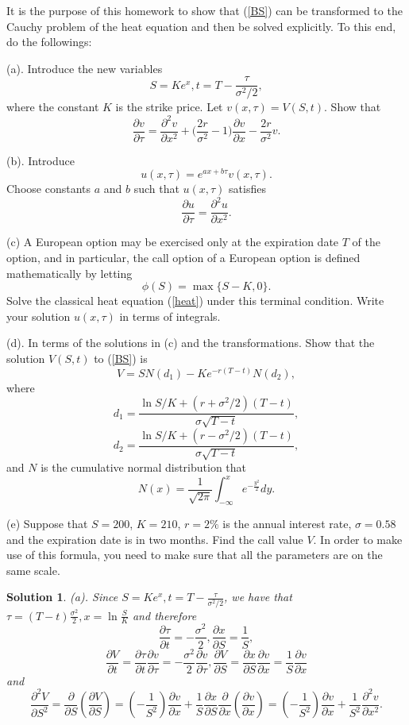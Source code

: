 \documentclass[6pt]{article}
\newtheorem{solution}{Solution}
\numberwithin{equation}{section}
\begin{document}
\begin{enumerate}
It is the purpose of this homework to show that (\ref{BS}) can be transformed to the Cauchy problem of the heat equation and then be solved explicitly.  To this end, do the followings:

(a).  Introduce the new variables
\[S=Ke^x, t=T-\frac{\tau}{\sigma^2/2},\]
where the constant $K$ is the strike price.  Let $v(x,\tau)=V(S,t)$.  Show that
\[\frac{\partial v}{\partial \tau}=\frac{\partial^2 v}{\partial x^2}+\Big(\frac{2r}{\sigma^2}-1\Big)\frac{\partial v}{\partial x}-\frac{2r}{\sigma^2}v.\]

(b).  Introduce
\[u(x,\tau)=e^{ax+b\tau}v(x,\tau).\]
Choose constants $a$ and $b$ such that $u(x,\tau)$ satisfies
\begin{equation}\label{heat}
\frac{\partial u}{\partial \tau}=\frac{\partial^2u}{\partial x^2}.
\end{equation}

(c)  A European option may be exercised only at the expiration date $T$ of the option, and in particular, the call option of a European option is defined mathematically by letting
\[\phi(S)=\max\{S-K,0\}.\]
Solve the classical heat equation (\ref{heat}) under this terminal condition.  Write your solution $u(x,\tau)$ in terms of integrals.

(d).  In terms of the solutions in (c) and the transformations.  Show that the solution $V(S,t)$ to (\ref{BS}) is
\[V=SN(d_1)-Ke^{-r(T-t)}N(d_2),\]
where
\[d_1=\frac{\ln S/K +(r+\sigma^2/2)(T-t)}{\sigma \sqrt {T-t}},\]
\[d_2=\frac{\ln S/K +(r-\sigma^2/2)(T-t)}{\sigma \sqrt {T-t}},\]
and $N$ is the cumulative normal distribution that
\[N(x)=\frac{1}{\sqrt {2\pi}}\int_{-\infty}^x e^{-\frac{y^2}{2}}dy.\]

(e)  Suppose that $S=200$, $K=210$, $r=2\%$ is the annual interest rate, $\sigma=0.58$ and the expiration date is in two months.  Find the call value $V$.  In order to make use of this formula, you need to make sure that all the parameters are on the same scale.
\begin{solution}
(a).   Since $S=Ke^x, t=T-\frac{\tau}{\sigma^2/2}$, we have that $\tau=(T-t)\frac{\sigma^2}{2}, x=\ln{\frac{S}{K}}$ and therefore
\[\frac{\partial \tau}{\partial t}=-\frac{\sigma^2}{2}, \frac{\partial x}{\partial S}=\frac{1}{S},\]
\[\frac{\partial V}{\partial t}=\frac{\partial \tau}{\partial t}\frac{\partial v}{\partial\tau}=-\frac{\sigma^2}{2}\frac{\partial v}{\partial\tau}, \frac{\partial V}{\partial S}=\frac{\partial x}{\partial S}\frac{\partial v}{\partial x}=\frac{1}{S}\frac{\partial v}{\partial x}\]
and
\[\frac{\partial^2 V}{\partial S^2}=\frac{\partial }{\partial S}(\frac{\partial V}{\partial S})=(-\frac{1}{S^2})\frac{\partial v}{\partial x}+\frac{1}{S}\frac{\partial x}{\partial S}\frac{\partial }{\partial x}(\frac{\partial v}{\partial x})=(-\frac{1}{S^2})\frac{\partial v}{\partial x}+\frac{1}{S^2}\frac{\partial^2 v}{\partial x^2}.\]


\end{solution}
\end{enumerate}
\end{document}
